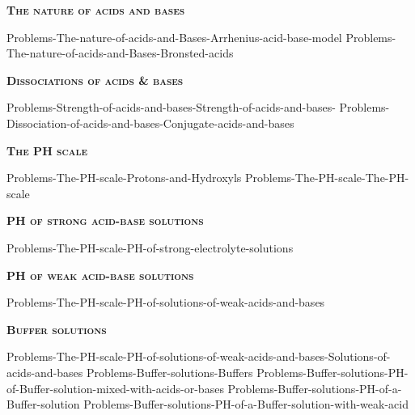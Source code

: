 \documentclass[main.tex]{subfiles}
\newcommand\chapterlabel{Ch-acidbase}
\begin{document}
\newpage
 
\fancyhfoffset[E,O]{0pt}
\setlength{\columnsep}{30pt}
\begin{conclusion}
\end{conclusion}
\begin{multicols*}{2}\setcounter{numA}{1}
{\raggedright\textsc{\textbf{The nature of acids and bases}}\par}
 {Problems-The-nature-of-acids-and-Bases-Arrhenius-acid-base-model}
 {Problems-The-nature-of-acids-and-Bases-Bronsted-acids}

{\raggedright\textsc{\textbf{Dissociations of acids \& bases}}\par}
 {Problems-Strength-of-acids-and-bases-Strength-of-acids-and-bases-}
 {Problems-Dissociation-of-acids-and-bases-Conjugate-acids-and-bases}
 
{\raggedright\textsc{\textbf{The PH scale}}\par}
 {Problems-The-PH-scale-Protons-and-Hydroxyls}
 {Problems-The-PH-scale-The-PH-scale}
 
  {\raggedright\textsc{\textbf{PH of strong acid-base solutions}}\par}
 {Problems-The-PH-scale-PH-of-strong-electrolyte-solutions}%
 
 
 
 {\raggedright\textsc{\textbf{PH of weak acid-base solutions}}\par}
 {Problems-The-PH-scale-PH-of-solutions-of-weak-acids-and-bases}%
			


{\raggedright\textsc{\textbf{Buffer solutions}}\par}
 {Problems-The-PH-scale-PH-of-solutions-of-weak-acids-and-bases-Solutions-of-acids-and-bases}%
 {Problems-Buffer-solutions-Buffers}
 {Problems-Buffer-solutions-PH-of-Buffer-solution-mixed-with-acids-or-bases}%
 {Problems-Buffer-solutions-PH-of-a-Buffer-solution}
 {Problems-Buffer-solutions-PH-of-a-Buffer-solution-with-weak-acid}%


\end{multicols*}
\end{document}
